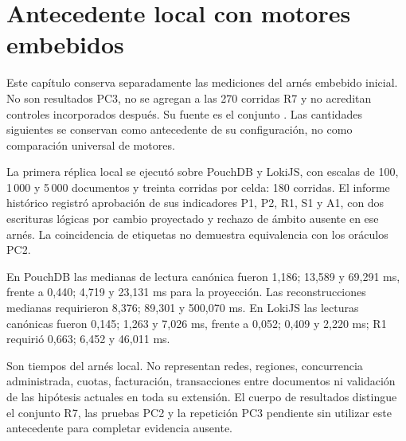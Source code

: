 \chapter{Antecedente local con motores embebidos}

Este capítulo conserva separadamente las mediciones del arnés embebido inicial.
No son resultados PC3, no se agregan a las 270 corridas R7 y no acreditan controles
incorporados después. Su fuente es el conjunto
. Las cantidades siguientes se conservan
como antecedente de su configuración, no como comparación universal de motores.

La primera réplica local se ejecutó sobre PouchDB y LokiJS, con escalas de 100,
1\,000 y 5\,000 documentos y treinta corridas por celda: 180 corridas. El informe
histórico registró aprobación de sus indicadores P1, P2, R1, S1 y A1, con dos
escrituras lógicas por cambio proyectado y rechazo de ámbito ausente en ese arnés.
La coincidencia de etiquetas no demuestra equivalencia con los oráculos PC2.

En PouchDB las medianas de lectura canónica fueron 1,186; 13,589 y 69,291 ms, frente a
0,440; 4,719 y 23,131 ms para la proyección. Las reconstrucciones medianas requirieron
8,376; 89,301 y 500,070 ms. En LokiJS las lecturas canónicas fueron 0,145; 1,263 y
7,026 ms, frente a 0,052; 0,409 y 2,220 ms; R1 requirió 0,663; 6,452 y 46,011 ms.

Son tiempos del arnés local. No representan redes, regiones, concurrencia administrada,
cuotas, facturación, transacciones entre documentos ni validación de las hipótesis
actuales en toda su extensión. El cuerpo de resultados distingue el conjunto R7,
las pruebas PC2 y la repetición PC3 pendiente sin utilizar este antecedente para
completar evidencia ausente.
